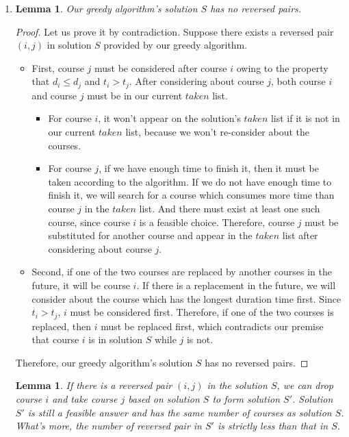 \documentclass[12pt,a4paper]{article}
\makeatletter
\newtheorem{lemma}[theorem]{Lemma}
\newtheorem*{solution}{Solution}
\theoremstyle{definition}
\renewenvironment{solution}[1][Solution] {\par\pushQED{\qed}\normalfont\topsep6\p@\@plus6\p@\relax\trivlist\item[\hskip\labelsep\bfseries#1\@addpunct{.}]\ignorespaces}{\popQED\endtrivlist\@endpefalse} \makeatother
\makeatother
\begin{document}
\begin{enumerate}
\begin{solution}
        \begin{lemma}
        \label{lemma3-1}
        Our greedy algorithm's solution $S$ has no reversed pairs.
        \end{lemma}
        \begin{proof}
        Let us prove it by contradiction. Suppose there exists a reversed pair $(i,j)$ in solution $S$ provided by our greedy algorithm.
        \begin{itemize}
        \item First, course $j$ must be considered after course $i$ owing to the property that $d_i \leq d_j$ and $t_i > t_j$. After considering about course $j$, both course $i$ and course $j$ must be in our current $taken$ list.
        \begin{itemize}
        \item For course $i$, it won't appear on the solution's $taken$ list if it is not in our current $taken$ list, because we won't re-consider about the courses.
        \item For course $j$, if we have enough time to finish it, then it must be taken according to the algorithm. If we do not have enough time to finish it, we will search for a course which consumes more time than course $j$ in the $taken$ list. And there must exist at least one such course, since course $i$ is a feasible choice. Therefore, course $j$ must be substituted for another course and appear in the $taken$ list after considering about course $j$.
        \end{itemize}
        \item Second, if one of the two courses are replaced by another courses in the future, it will be course $i$. If there is a replacement in the future, we will consider about the course which has the longest duration time first. Since $t_i > t_j$, $i$ must be considered first. Therefore, if one of the two courses is replaced, then $i$ must be replaced first, which contradicts our premise that course $i$ is in solution $S$ while $j$ is not.
        \end{itemize}
        Therefore, our greedy algorithm's solution $S$ has no reversed pairs.
        \end{proof}
        \begin{lemma}
        \label{lemma3-2}
        If there is a reversed pair $(i,j)$ in the solution $S$, we can drop course $i$ and take course $j$ based on solution $S$ to form solution $S'$. Solution $S'$ is still a feasible answer and has the same number of courses as solution $S$. What's more, the number of reversed pair in $S'$ is strictly less than that in $S$.

\end{lemma}
\end{solution}
\end{enumerate}
\end{document}
